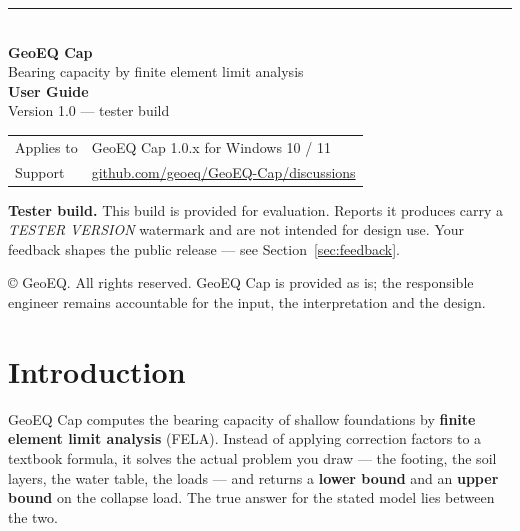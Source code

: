 \documentclass[11pt,a4paper]{article}
\begin{document}
\begin{titlepage}
\color{ink}
\vspace*{18mm}
{\color{brand}\rule{\textwidth}{2pt}}\\[14mm]
{\fontsize{34}{40}\selectfont\bfseries GeoEQ Cap}\\[4mm]
{\LARGE Bearing capacity by finite element limit analysis}\\[24mm]
{\fontsize{20}{26}\selectfont\bfseries User Guide}\\[3mm]
{\large Version 1.0 --- tester build}\\[40mm]
\begin{tabular}{@{}ll@{}}
\textcolor{muted}{Applies to} & GeoEQ Cap 1.0.x for Windows 10 / 11\\
\textcolor{muted}{Support} & \href{https://github.com/geoeq/GeoEQ-Cap/discussions}{github.com/geoeq/GeoEQ-Cap/discussions}\\
\end{tabular}
\vfill
\begin{tcolorbox}[colback=amber!6,colframe=amber,boxrule=0.6pt,arc=2pt,fontupper=\small]
\textbf{Tester build.} This build is provided for evaluation. Reports it produces carry a \emph{TESTER VERSION} watermark and are not intended for design use. Your feedback shapes the public release --- see Section~\ref{sec:feedback}.
\end{tcolorbox}
\vspace{6mm}
{\small\color{muted}\copyright{} GeoEQ. All rights reserved. GeoEQ Cap is provided as is; the responsible engineer remains accountable for the input, the interpretation and the design.}
\end{titlepage}

\tableofcontents
\clearpage

\section{Introduction}

GeoEQ Cap computes the bearing capacity of shallow foundations by \textbf{finite element limit analysis} (FELA). Instead of applying correction factors to a textbook formula, it solves the actual problem you draw --- the footing, the soil layers, the water table, the loads --- and returns a \textbf{lower bound} and an \textbf{upper bound} on the collapse load. The true answer for the stated model lies between the two.
\end{document}
